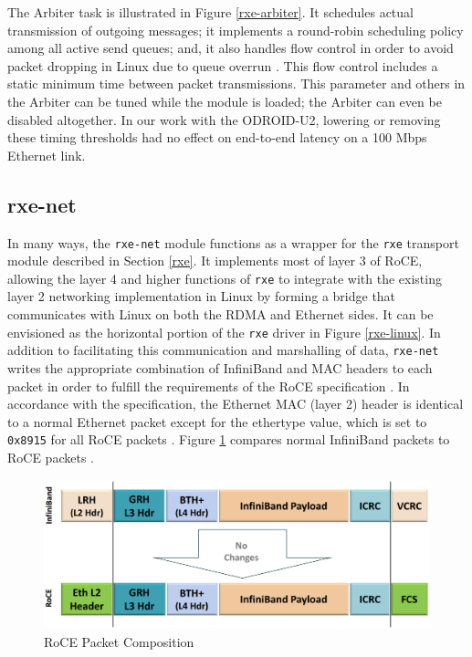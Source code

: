 \documentclass[11pt]{book}
\begin{document}
The Arbiter task is illustrated in Figure \ref{rxe-arbiter}.  It schedules actual
transmission of outgoing messages; it implements a round-robin scheduling policy among all
active send queues; and, it also handles flow control in order to avoid packet dropping in
Linux due to queue overrun \cite{pearson-10}.  This flow control includes a static minimum
time between packet transmissions.  This parameter and others in the Arbiter can be tuned
while the module is loaded; the Arbiter can even be disabled altogether.  In our work with
the ODROID-U2, lowering or removing these timing thresholds had no effect on end-to-end
latency on a 100 Mbps Ethernet link.

\subsection{rxe-net}

In many ways, the \verb;rxe-net; module functions as a wrapper for the \verb;rxe;
transport module described in Section \ref{rxe}.  It implements most of layer 3 of RoCE,
allowing the layer 4 and higher functions of \verb;rxe; to integrate with the existing
layer 2 networking implementation in Linux by forming a bridge that communicates with
Linux on both the RDMA and Ethernet sides.  It can be envisioned as the horizontal portion
of the \verb;rxe; driver in Figure \ref{rxe-linux}.  In addition to facilitating this
communication and marshalling of data, \verb;rxe-net; writes the appropriate combination
of InfiniBand and MAC headers to each packet in order to fulfill the requirements of the
RoCE specification \cite{pearson-10,InfiniBandTARoCE-10}.  In accordance with the
specification, the Ethernet MAC (layer 2) header is identical to a normal Ethernet packet
except for the ethertype value, which is set to \verb;0x8915; for all RoCE packets
\cite{InfiniBandTARoCE-10}.  Figure \ref{roce-packet} compares normal InfiniBand packets
to RoCE packets \cite{ayoub-11,InfiniBandTABase-07,InfiniBandTARoCE-10}.

\begin{figure}
\includegraphics[width=\textwidth]{roce_packet}
\caption{RoCE Packet Composition \cite{ayoub-11}}\label{roce-packet}
\end{figure}
\end{document}
